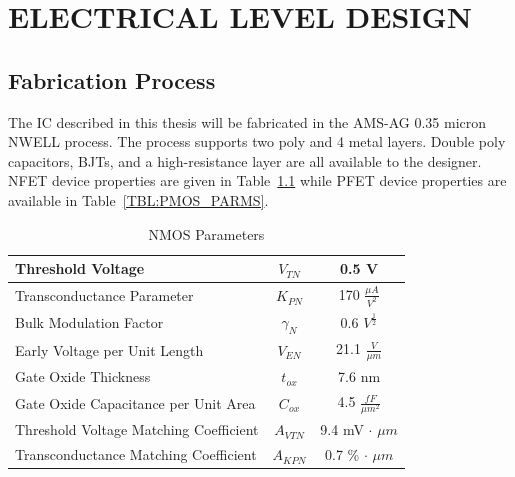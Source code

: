 \documentclass[12pt,oneside,final]{siuethesis}
\theoremstyle{definition}
\begin{document}
\chapter{ELECTRICAL LEVEL DESIGN}

\section{Fabrication Process}

The IC described in this thesis will be fabricated in the AMS-AG 0.35 micron NWELL process.  The process supports two poly and 4 metal layers. Double poly capacitors, BJTs, and a high-resistance layer are all available to the designer. NFET device properties are given in Table~\ref{TBL:NMOS_PARMS} while PFET device properties are available in Table~\ref{TBL:PMOS_PARMS}.


\begin{table} [htbp!]
\begin{center}
\begin{tabular}{| l | c | c |}
\hline 
Threshold Voltage & $V_{TN}$ & 0.5 V \\ 
\hline 
Transconductance Parameter & $K_{PN}$  &  170 $\frac{\mu A}{V^2}$ \\ 
\hline 
Bulk Modulation Factor & $\gamma_{N}$  &  0.6 $V^{\frac{1}{2}}$ \\ 
\hline 
Early Voltage per Unit Length & $V_{EN}$  &  21.1 $\frac{V}{\mu m}$ \\ 
\hline 
Gate Oxide Thickness & $t_{ox}$  &  7.6 nm \\ 
\hline 
Gate Oxide Capacitance per Unit Area & $C_{ox}$  & 4.5 $\frac{fF}{\mu m^2}$ \\ 
\hline 
Threshold Voltage Matching Coefficient & $A_{VTN}$  &  9.4 mV $\cdot$ $\mu m$ \\ 
\hline 
Transconductance Matching Coefficient & $A_{KPN}$  &  0.7 \% $\cdot$ $\mu m$ \\ 
\hline 
\end{tabular} 
\end{center}
\caption{NMOS Parameters}
\label{TBL:NMOS_PARMS}
\end{table}

 
\end{document}
